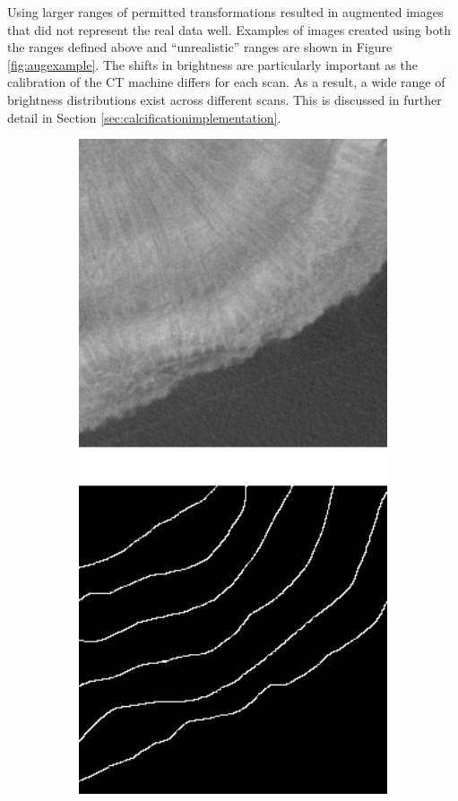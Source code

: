 Using larger ranges of permitted transformations resulted in augmented images that did not represent the real data well. Examples of images created using both the ranges defined above and ``unrealistic'' ranges are shown in Figure \ref{fig:augexample}. The shifts in brightness are particularly important as the calibration of the CT machine differs for each scan. As a result, a wide range of brightness distributions exist across different scans. This is discussed in further detail in Section \ref{sec:calcificationimplementation}.

\begin{figure}[t]
    \centering
    \begin{subfigure}[t]{0.18\textwidth}
        \centering
        \includegraphics[width=1\textwidth, valign=c]{images/orig-aug.png}

\end{subfigure}
\end{figure}

